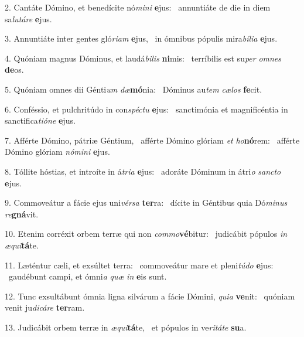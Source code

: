 2. Cantáte Dómino, et benedícite nó\textit{mi}\textit{ni} \textbf{e}jus: \ast\  annuntiáte de die in diem sa\textit{lu}\textit{tá}\textit{re} \textbf{e}jus.\

3. Annuntiáte inter gentes gló\textit{ri}\textit{am} \textbf{e}jus, \ast\  in ómnibus pópulis mira\textit{bí}\textit{li}\textit{a} \textbf{e}jus.\

4. Quóniam magnus Dóminus, et laudá\textit{bi}\textit{lis} \textbf{ni}mis: \ast\  terríbilis est su\textit{per} \textit{om}\textit{nes} \textbf{de}os.\

5. Quóniam omnes dii Génti\textit{um} \textit{dæ}\textbf{mó}nia: \ast\  Dóminus au\textit{tem} \textit{cæ}\textit{los} \textbf{fe}cit.\

6. Conféssio, et pulchritúdo in con\textit{spéc}\textit{tu} \textbf{e}jus: \ast\  sanctimónia et magnificéntia in sanctifica\textit{ti}\textit{ó}\textit{ne} \textbf{e}jus.\

7. Afférte Dómino, pátriæ Géntium, \dag\  afférte Dómino glóriam \textit{et} \textit{ho}\textbf{nó}rem: \ast\  afférte Dómino glóriam \textit{nó}\textit{mi}\textit{ni} \textbf{e}jus.\

8. Tóllite hóstias, et introíte in á\textit{tri}\textit{a} \textbf{e}jus: \ast\  adoráte Dóminum in átri\textit{o} \textit{sanc}\textit{to} \textbf{e}jus.\

9. Commoveátur a fácie ejus uni\textit{vér}\textit{sa} \textbf{ter}ra: \ast\  dícite in Géntibus quia Dó\textit{mi}\textit{nus} \textit{re}\textbf{gná}vit.\

10. Etenim corréxit orbem terræ qui non \textit{com}\textit{mo}\textbf{vé}bitur: \ast\  judicábit pópulos \textit{in} \textit{æ}\textit{qui}\textbf{tá}te.\

11. Læténtur cæli, et exsúltet terra: \dag\  commoveátur mare et pleni\textit{tú}\textit{do} \textbf{e}jus: \ast\  gaudébunt campi, et ómni\textit{a} \textit{quæ} \textit{in} \textbf{e}is sunt.\

12. Tunc exsultábunt ómnia ligna silvárum a fácie Dómini, \textit{qui}\textit{a} \textbf{ve}nit: \ast\  quóniam venit ju\textit{di}\textit{cá}\textit{re} \textbf{ter}ram.\

13. Judicábit orbem terræ in \textit{æ}\textit{qui}\textbf{tá}te, \ast\  et pópulos in ve\textit{ri}\textit{tá}\textit{te} \textbf{su}a.\

